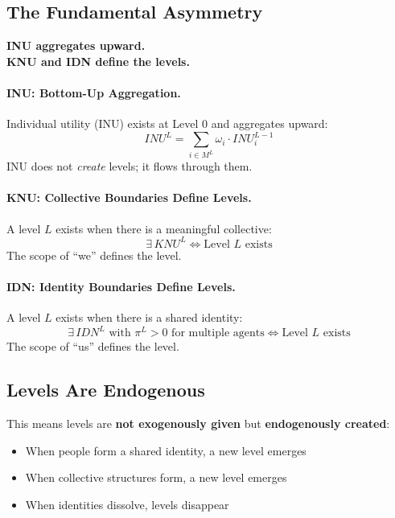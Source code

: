 \subsection{The Fundamental Asymmetry}

\begin{tcolorbox}[colback=blue!5!white, colframe=blue!50!black]
\textbf{INU aggregates upward.} \\
\textbf{KNU and IDN define the levels.}
\end{tcolorbox}

\paragraph{INU: Bottom-Up Aggregation.}
Individual utility (INU) exists at Level 0 and aggregates upward:
\begin{equation}
INU^L = \sum_{i \in M^L} \omega_i \cdot INU^{L-1}_i
\end{equation}
INU does not \emph{create} levels; it flows through them.

\paragraph{KNU: Collective Boundaries Define Levels.}
A level $L$ exists when there is a meaningful collective:
\begin{equation}
\exists \, KNU^L \iff \text{Level } L \text{ exists}
\end{equation}
The scope of ``we'' defines the level.

\paragraph{IDN: Identity Boundaries Define Levels.}
A level $L$ exists when there is a shared identity:
\begin{equation}
\exists \, IDN^L \text{ with } \pi^L > 0 \text{ for multiple agents} \iff \text{Level } L \text{ exists}
\end{equation}
The scope of ``us'' defines the level.

\subsection{Levels Are Endogenous}

This means levels are \textbf{not exogenously given} but \textbf{endogenously created}:
\begin{itemize}
\item When people form a shared identity, a new level emerges
\item When collective structures form, a new level emerges
\item When identities dissolve, levels disappear
\end{itemize}

